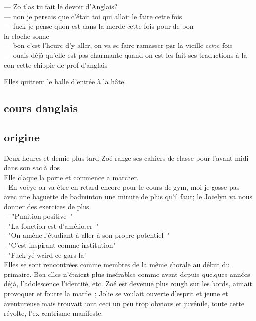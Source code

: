 \documentclass{article}
\begin{document}
\clearpage

--- Zo t’as tu fait le devoir d’Anglais?  \\
--- non je pensais que c'était toi qui allait le faire cette fois\\
--- fuck je pense quon est dans la merde cette fois pour de bon\\

la cloche sonne\\

--- bon c'est l'heure d'y aller, on va se faire ramasser par la vieille cette fois\\
--- ouais déjà qu'elle est pas charmante quand on est les fait ses traductions à la
con cette chippie de prof d'anglais

Elles quittent le halle d'entrée à la hâte.

\clearpage

\subsection{cours danglais}

\clearpage


\subsection{origine}

\clearpage

Deux heures et demie plus tard Zoé range ses cahiers de classe pour l’avant midi
dans son sac à dos \\
Elle claque la porte et commence a marcher.\\
- En-voèye on va être en retard encore pour le cours de gym, moi je gosse pas
avec une baguette de badminton une minute de plus qu’il faut; le Jocelyn va
nous donner des exercices de plus\\\
- "Punition positive "\\
- "La fonction est d’améliorer "\\
- "On amène l’étudiant à aller à son propre potentiel "\\
- "C’est inspirant comme institution"\\
- "Fuck yé weird ce gars la"\\


Elles se sont rencontrées comme membres de la même chorale au début du
primaire. Bon elles n’étaient plus insérables comme avant depuis quelques
années déjà, l’adolescence l’identité, etc. Zoé est devenue plus rough sur
les bords, aimait provoquer et foutre la marde ; Jolie se voulait ouverte
d’esprit et jeune et aventureuse mais trouvait tout ceci un peu trop obvious et
juvénile, toute cette révolte, l’ex-centrisme manifeste.\\
\end{document}
